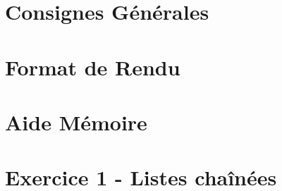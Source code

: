 \documentclass[12pt,a4paper]{article}
\begin{document}
\maketitle





\clearpage

\tableofcontents

\clearpage

\section{Consignes Générales}

\bigskip



\clearpage

\section{Format de Rendu}
\label{sec:FormatDeRendu}

\vspace*{1cm}



\clearpage

\section{Aide Mémoire}
\label{sec:AideMemoire}

\vspace*{1cm}



\clearpage


%
%
%
%


\section{Exercice 1 - Listes chaînées}
\end{document}
